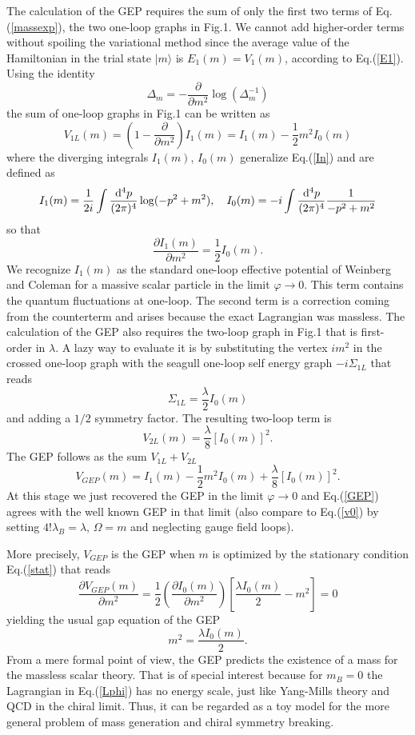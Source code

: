 \documentclass[aps,preprint]{revtex4}
\newcommand{\BE}{\begin{equation}}
\newcommand{\EE}{\end{equation}}
\newcommand{\ppp}{ \frac{{\rm d}^4p}{(2\pi)^4}}
\begin{document}
The calculation of the GEP requires the sum of only the first two terms of Eq.(\ref{massexp}), 
the two one-loop graphs in Fig.1.  We cannot add
higher-order terms without spoiling the variational method since the average value of the Hamiltonian
in the trial state $\vert m\rangle$ is  $E_1(m)=V_1(m)$, according to Eq.(\ref{E1}).
Using the identity
\BE
\Delta_m=-\frac{\partial}{\partial m^2} \log(\Delta_m^{-1})
\EE
the sum of one-loop graphs in Fig.1 can be written as
\BE
V_{1L} (m)=\left( 1-\frac{\partial}{\partial m^2}\right) I_1(m)=I_1(m)-\frac{1}{2} m^2 I_0(m)
\label{V1L}
\EE
where the diverging integrals $I_1(m)$, $I_0 (m)$ generalize Eq.(\ref{In}) and are defined as
\BE
I_1(m)=\frac{1}{2i}\int \ppp \log(-p^2+m^2),\quad
I_0(m)=-i\int \ppp \frac{1}{-p^2+m^2}
\label{I}
\EE
so that 
\BE
\frac{\partial I_1 (m)}{\partial m^2}=\frac{1}{2} I_0(m).
\label{dI1}
\EE
We recognize $I_1 (m)$ as the standard one-loop effective potential of Weinberg and Coleman for a
massive scalar particle in the limit $\varphi\to 0$. This term contains the quantum fluctuations at
one-loop. The second term is a correction coming from the counterterm and arises because the exact
Lagrangian was massless. The calculation of the GEP also requires the two-loop graph in Fig.1 that
is first-order in $\lambda$. A lazy way to evaluate it is by substituting the vertex $im^2$ in
the crossed one-loop graph with the seagull one-loop self energy graph $-i \Sigma_{1L}$ that reads\cite{gep2}
\BE
\Sigma_{1L}=\frac{\lambda}{2} I_0 (m)
\EE
and adding a $1/2$ symmetry factor. The resulting two-loop term is
\BE
V_{2L} (m)=\frac{\lambda}{8} [I_0 (m)]^2.
\label{V2L}
\EE
The GEP follows as the sum $V_{1L}+V_{2L}$
\BE
V_{GEP}(m)=I_1(m)-\frac{1}{2}m^2 I_0(m) +\frac{\lambda}{8} [I_0 (m)]^2.
\label{GEP}
\EE
At this stage we just recovered the GEP in the limit $\varphi\to 0$ and Eq.(\ref{GEP}) agrees with
the well known GEP in that limit\cite{stevenson,stancu2,stancu,gep2} (also compare to Eq.(\ref{v0}) by
setting $4!\lambda_B=\lambda$, $\Omega=m$ and neglecting gauge field loops).

More precisely, $V_{GEP}$ is the GEP when $m$ is optimized by the stationary condition Eq.(\ref{stat})
that reads
\BE
\frac{\partial V_{GEP} (m)}{\partial m^2}=\frac{1}{2}\left(\frac{\partial I_0 (m)}{\partial m^2}\right)
\left[\frac{\lambda I_0(m)}{2}-m^2\right]=0
\label{factors}
\EE
yielding the usual gap equation of the GEP
\BE
m^2=\frac{\lambda I_0(m)}{2}.
\label{gap}
\EE
From a mere formal point of view, the GEP predicts the existence of a mass for the  massless scalar theory.
That is of special interest because for $m_B=0$ the Lagrangian in Eq.(\ref{Lphi}) has no energy scale, just
like Yang-Mills theory and QCD in the chiral limit. Thus, it can be regarded as a toy model for the more
general problem of mass generation and chiral symmetry breaking.
\end{document}
